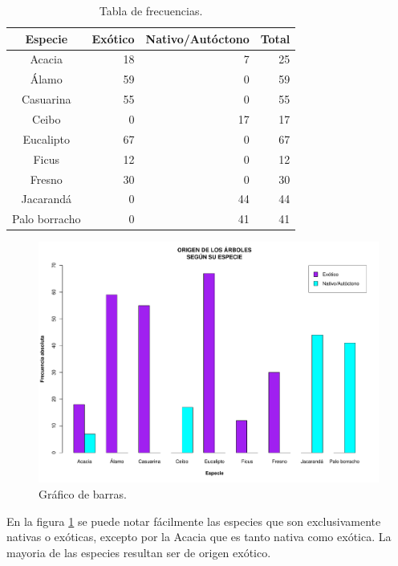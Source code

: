 \documentclass[11pt]{article}
\begin{document}
\begin{table}[h!]
  \begin{center}
    \begin{tabular}{| c | r | r | r |}
      \hline
      \textbf{Especie} & \textbf{Exótico} & \textbf{Nativo/Autóctono} & \textbf{Total} \\ \hline
      Acacia & 18 & 7 & 25 \\ \hline
      Álamo & 59 & 0 & 59 \\ \hline
      Casuarina & 55 & 0 & 55 \\ \hline
      Ceibo & 0 & 17 & 17 \\ \hline
      Eucalipto & 67 & 0 & 67 \\ \hline
      Ficus & 12 & 0 & 12 \\ \hline
      Fresno & 30 & 0 & 30 \\ \hline
      Jacarandá & 0 & 44 & 44 \\ \hline
      Palo borracho & 0 & 41 & 41 \\ \hline
    \end{tabular}
    \caption{Tabla de frecuencias.}
    \label{tab:tablaOrigenEspecie}
  \end{center}
\end{table}

\begin{figure}[h!]
  \begin{center}
    \includegraphics[width=0.9\linewidth]{barrasOrigenEspecie.pdf}
    \caption{Gráfico de barras.}
    \label{fig:barrasOrigenEspecie}
  \end{center}  
\end{figure}

\begin{justify}
  En la figura \ref{fig:barrasOrigenEspecie} se puede notar fácilmente
  las especies que son exclusivamente nativas o exóticas, excepto por la Acacia
  que es tanto nativa como exótica. La mayoria de las especies resultan ser
  de origen exótico.
\end{justify}
\end{document}

